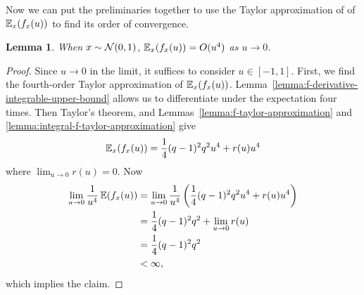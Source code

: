 \documentclass{article}
\theoremstyle{plain}
\newtheorem{lemma}[theorem]{Lemma}
\theoremstyle{definition}
\theoremstyle{remark}
\begin{document}
Now we can put the preliminaries together to use the Taylor approximation of 
of $\operatorname{\mathbb{E}}_x(f_x(u))$ to find its order of convergence.
\begin{lemma}\label{lemma:integral-f-order}
    When $x\sim \mathcal{N}(0, 1)$, $\operatorname{\mathbb{E}}_x(f_x(u)) = O(u^4)$ as $u\to 0$.
\end{lemma}
\begin{proof}
    Since $u\to 0$ in the limit, it suffices to consider $u\in [-1, 1]$. 
    First, we find the fourth-order Taylor approximation of $\operatorname{\mathbb{E}}_x(f_x(u))$.
    Lemma~\ref{lemma:f-derivative-integrable-upper-bound} allows us to differentiate under the 
    expectation four times. Then Taylor's theorem, and Lemmas~\ref{lemma:f-taylor-approximation} and 
    \ref{lemma:integral-f-taylor-approximation} give
    \begin{equation}
        \operatorname{\mathbb{E}}_x(f_x(u)) = \frac{1}{4}(q - 1)^2q^2 u^4 + r(u)u^4
    \end{equation}
    where $\lim_{u\to 0} r(u) = 0$.
    Now
    \begin{equation}
        \begin{split}
            \lim_{u\to 0} \frac{1}{u^4}\operatorname{\mathbb{E}}(f_x(u))
            &= \lim_{u\to 0} \frac{1}{u^4}\left(\frac{1}{4}(q - 1)^2q^2 u^4 + r(u)u^4\right)
            \\&= \frac{1}{4}(q - 1)^2q^2 + \lim_{u\to 0} r(u)
            \\&= \frac{1}{4}(q - 1)^2q^2
            \\&< \infty,
        \end{split}
    \end{equation}
    which implies the claim.
\end{proof}
\end{document}

